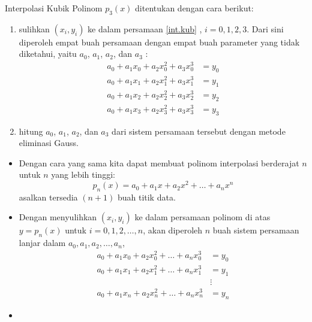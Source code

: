 \documentclass[pdflatex,compress,mathserif]{beamer}
\begin{document}
\begin{frame}{Interpolasi Kubik}
	Polinom $ p_3(x) $ ditentukan dengan cara berikut:
	\begin{enumerate}
		\item sulihkan $ (x_i, y_i) $ ke dalam persamaan \ref{int.kub} , $ i = 0, 1, 2, 3 $. Dari sini diperoleh empat buah persamaan dengan empat buah parameter yang tidak diketahui, yaitu $ a_0 $, $ a_1 $, $ a_2 $, dan $ a_3 $ :
		\begin{align*}
			a_0 + a_1 x_0 + a_2 x_0^2 + a_3 x_0^3 &= y_0 \\
			a_0 + a_1 x_1 + a_2 x_1^2 + a_3 x_1^3 &= y_1 \\
			a_0 + a_1 x_2 + a_2 x_2^2 + a_3 x_2^3 &= y_2 \\
			a_0 + a_1 x_3 + a_2 x_3^2 + a_3 x_3^3 &= y_3
		\end{align*}
		\item hitung $ a_0 $, $ a_1 $, $ a_2 $, dan $ a_3 $ dari sistem persamaan tersebut dengan metode eliminasi Gauss.
	\end{enumerate}
\end{frame}

\begin{frame}
	\begin{itemize}
		\item Dengan cara yang sama kita dapat membuat polinom interpolasi berderajat $ n $ untuk $ n $ yang lebih tinggi:
		\[ p_n(x) = a_0 + a_1 x + a_2 x^2 + \dots + a_n x^n \]
		asalkan tersedia $ (n+1) $ buah titik data.
		\item Dengan menyulihkan $ (x_i, y_i) $ ke dalam persamaan polinom di atas $ y = p_n(x) $ untuk $ i = 0, 1, 2, \dots, n $, akan diperoleh $ n $ buah sistem persamaan lanjar dalam $ a_0, a_1, a_2, \dots , a_n $,
		\begin{align*}
			a_0 + a_1 x_0 + a_2 x_0^2 + \dots + a_n x_0^3 &= y_0 \\
			a_0 + a_1 x_1 + a_2 x_1^2 + \dots + a_n x_1^3 &= y_1 \\
			&\vdots \\
			a_0 + a_1 x_n + a_2 x_n^2 + \dots + a_n x_n^3 &= y_n
		\end{align*}
		\item[] 
	\end{itemize}
\end{frame}
\end{document}
